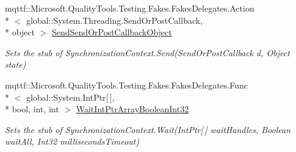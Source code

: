 \begin{DoxyCompactItemize}
mqttf\-::\-Microsoft.\-Quality\-Tools.\-Testing.\-Fakes.\-Fakes\-Delegates.\-Action\\*
$<$ global\-::\-System.\-Threading.\-Send\-Or\-Post\-Callback, \\*
object $>$ \hyperlink{class_system_1_1_threading_1_1_fakes_1_1_stub_synchronization_context_a4af5bfcf1912c7cc7daee033c2f541ae}{Send\-Send\-Or\-Post\-Callback\-Object}
\begin{DoxyCompactList}\small\item\em Sets the stub of Synchronization\-Context.\-Send(\-Send\-Or\-Post\-Callback d, Object state)\end{DoxyCompactList}\item 
mqttf\-::\-Microsoft.\-Quality\-Tools.\-Testing.\-Fakes.\-Fakes\-Delegates.\-Func\\*
$<$ global\-::\-System.\-Int\-Ptr\mbox{[}$\,$\mbox{]}, \\*
bool, int, int $>$ \hyperlink{class_system_1_1_threading_1_1_fakes_1_1_stub_synchronization_context_a86d9af64879d5f83792610d6aa4622b4}{Wait\-Int\-Ptr\-Array\-Boolean\-Int32}
\begin{DoxyCompactList}\small\item\em Sets the stub of Synchronization\-Context.\-Wait(\-Int\-Ptr\mbox{[}$\,$\mbox{]} wait\-Handles, Boolean wait\-All, Int32 milliseconds\-Timeout)\end{DoxyCompactList}\end{DoxyCompactItemize}
